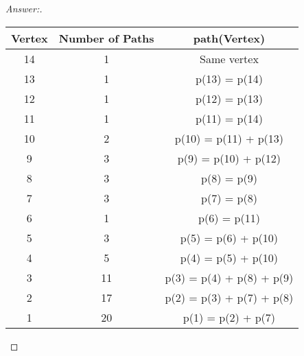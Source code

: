 \documentclass[11pt]{article}
\theoremstyle{definition}
\theoremstyle{definition}
\theoremstyle{definition}
\begin{document}
\begin{proof}[Answer:] \
\item
\item
\item
\begin{tabular}{|c|c|c|} 
\hline
\textbf{Vertex} & \textbf{Number of Paths} & \textbf{path(Vertex)} \\
\hline
14 & 1 & Same vertex\\
\hline
13 & 1 & p(13) = p(14) \\
\hline
12 & 1 & p(12) = p(13) \\
\hline
11 & 1 & p(11) = p(14) \\
\hline
10 & 2 & p(10) = p(11) + p(13) \\
\hline
9 & 3 & p(9) = p(10) + p(12) \\
\hline
8 & 3 & p(8) = p(9) \\
\hline
7 & 3 & p(7) = p(8) \\
\hline
6 & 1 & p(6) = p(11) \\
\hline
5 & 3 & p(5) = p(6) + p(10) \\
\hline
4 & 5 & p(4) = p(5) + p(10) \\
\hline
3 & 11 & p(3) = p(4) + p(8) + p(9) \\
\hline
2 & 17 & p(2) = p(3) + p(7) + p(8) \\
\hline
1 & 20 & p(1) = p(2) + p(7) \\
\hline
\end{tabular}
\end{proof}




\newpage
\end{document}
